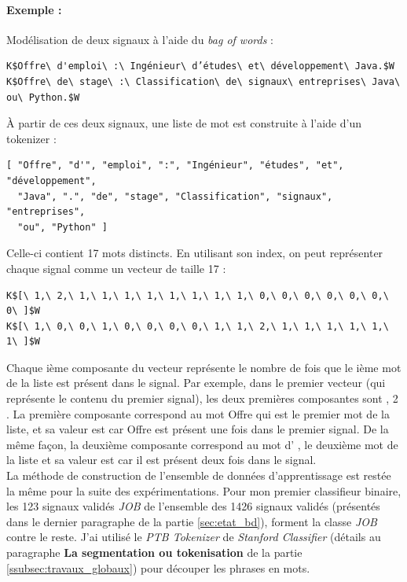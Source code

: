             \paragraph{Exemple :}
                Modélisation de deux signaux à l'aide du \textit{bag of words} :
\begin{lstlisting}
K$Offre\ d'emploi\ :\ Ingénieur\ d’études\ et\ développement\ Java.$W
K$Offre\ de\ stage\ :\ Classification\ de\ signaux\ entreprises\ Java\ ou\ Python.$W
\end{lstlisting}
                À partir de ces deux signaux, une liste de mot est construite à l'aide d'un tokenizer :
\begin{verbatim}
[ "Offre", "d'", "emploi", ":", "Ingénieur", "études", "et", "développement",
  "Java", ".", "de", "stage", "Classification", "signaux", "entreprises",
  "ou", "Python" ]
\end{verbatim}
                Celle-ci contient 17 mots distincts. En utilisant son index, on peut représenter chaque signal comme un vecteur de taille 17 :
\begin{lstlisting}
K$[\ 1,\ 2,\ 1,\ 1,\ 1,\ 1,\ 1,\ 1,\ 1,\ 1,\ 0,\ 0,\ 0,\ 0,\ 0,\ 0,\ 0\ ]$W
K$[\ 1,\ 0,\ 0,\ 1,\ 0,\ 0,\ 0,\ 0,\ 1,\ 1,\ 2,\ 1,\ 1,\ 1,\ 1,\ 1,\ 1\ ]$W
\end{lstlisting}
                Chaque ième composante du vecteur représente le nombre de fois que le ième mot de la liste est présent dans le signal. Par exemple, dans le premier vecteur (qui représente le contenu du premier signal), les deux premières composantes sont , 2 \fg. La première composante correspond au mot \og Offre \fg qui est le premier mot de la liste, et sa valeur est  \fg car \og Offre \fg est présent une fois dans le premier signal. De la même façon, la deuxième composante correspond au mot \og d' \fg, le deuxième mot de la liste et sa valeur est  \fg car il est présent deux fois dans le signal.\\

                La méthode de construction de l'ensemble de données d'apprentissage est restée la même pour la suite des expérimentations. Pour mon premier classifieur binaire, les 123 signaux validés \textit{JOB} de l'ensemble des 1426 signaux validés (présentés dans le dernier paragraphe de la partie \ref{sec:etat_bd}), forment la classe \textit{JOB} contre le reste. J'ai utilisé le \textit{PTB Tokenizer} de \textit{Stanford Classifier} (détails au paragraphe \textbf{La segmentation ou tokenisation} de la partie \ref{ssubsec:travaux_globaux}) pour découper les phrases en mots.\\

